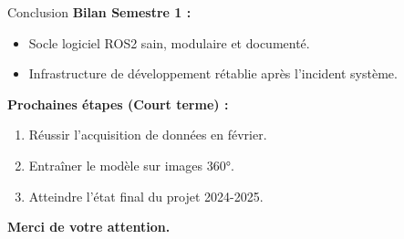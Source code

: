 \documentclass[aspectratio=169]{beamer}
\begin{document}
\begin{frame}{Conclusion}
    \textbf{Bilan Semestre 1 :}
    \begin{itemize}
        \item Socle logiciel ROS2 sain, modulaire et documenté.
        \item Infrastructure de développement rétablie après l'incident système.
    \end{itemize}

    \vspace{0.5cm}

    \textbf{Prochaines étapes (Court terme) :}
    \begin{enumerate}
        \item Réussir l'acquisition de données en février.
        \item Entraîner le modèle sur images 360°.
        \item Atteindre l'état final du projet 2024-2025.
    \end{enumerate}
    
    \vspace{1cm}
    \centering
    \Large \textbf{Merci de votre attention.}
\end{frame}
\end{document}
